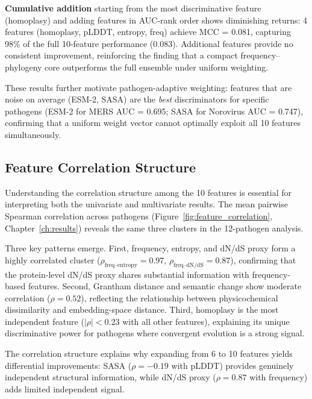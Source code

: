 \textbf{Cumulative addition} starting from the most discriminative feature (homoplasy) and adding features in AUC-rank order shows diminishing returns: 4 features (homoplasy, pLDDT, entropy, freq) achieve MCC = 0.081, capturing 98\% of the full 10-feature performance (0.083).
Additional features provide no consistent improvement, reinforcing the finding that a compact frequency--phylogeny core outperforms the full ensemble under uniform weighting.

These results further motivate pathogen-adaptive weighting: features that are noise on average (ESM-2, SASA) are the \textit{best} discriminators for specific pathogens (ESM-2 for MERS AUC = 0.695; SASA for Norovirus AUC = 0.747), confirming that a uniform weight vector cannot optimally exploit all 10 features simultaneously.

\subsection{Feature Correlation Structure}
\label{subsec:feature_correlation_adapt}

Understanding the correlation structure among the 10 features is essential for interpreting both the univariate and multivariate results. The mean pairwise Spearman correlation across pathogens (Figure~\ref{fig:feature_correlation}, Chapter~\ref{ch:results}) reveals the same three clusters in the 12-pathogen analysis.

Three key patterns emerge.
First, frequency, entropy, and dN/dS proxy form a highly correlated cluster ($\rho_{\text{freq--entropy}} = 0.97$, $\rho_{\text{freq--dN/dS}} = 0.87$), confirming that the protein-level dN/dS proxy shares substantial information with frequency-based features.
Second, Grantham distance and semantic change show moderate correlation ($\rho = 0.52$), reflecting the relationship between physicochemical dissimilarity and embedding-space distance.
Third, homoplasy is the most independent feature ($|\rho| < 0.23$ with all other features), explaining its unique discriminative power for pathogens where convergent evolution is a strong signal.

The correlation structure explains why expanding from 6 to 10 features yields differential improvements: SASA ($\rho = -0.19$ with pLDDT) provides genuinely independent structural information, while dN/dS proxy ($\rho = 0.87$ with frequency) adds limited independent signal.


